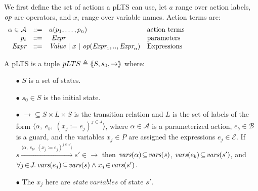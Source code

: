 \documentclass{lncs/llncs}
\newcommand{\QIN}[1]{\textcolor{airforceblue}{#1}}
\def\AlgE{\mathcal{E}}
\def\AlgA{\mathcal{A}}
\def\AlgB{\mathcal{B}}
\begin{document}
We first define the set of actions a pLTS can use, let $a$
range over action labels, $\symb{op}$ are operators, and $x_i$ range over
variable names. Action terms are:
\[
\begin{array}[l]{rcl@{\quad}p{5.5cm}}
  \alpha\in\AlgA&::=&a(p_1,\ldots,p_n)&\text{action terms}\\
  p_i&::=& ~\symb{Expr}&\text{parameters}\\
  \symb{Expr}&::=& \symb{Value}~|~x~|~\symb{op}(\symb{Expr}_1,..,\symb{Expr}_n)&\text{Expressions}
\end{array}
\]


\begin{definition}[pLTS]
\label{pLTS}
A pLTS is a tuple
$pLTS\triangleq\langle\hspace{-0.58ex}\langle S,s_0, \to\rangle\hspace{-0.58ex}\rangle$ where:
\begin{itemize}
\item[$\bullet$]
$S$ is a set of states.
\item[$\bullet$]
$s_0 \in S$ is the initial state.
\item[$\bullet$] $\to \subseteq S \times L \times S$ is the transition relation and 
$L$ is the set of labels of the form
$\langle \alpha,~e_b,~(x_j\!:= {e}_j)^{j\in J}\rangle$,
where $\alpha \in\AlgA$ is a parameterized action, $e_b \in
\AlgB$ is a guard, and the variables $x_j\in P$
are assigned the expressions $e_j\in \AlgE$.
If 
$s \xrightarrow{\langle \alpha,~e_b,~(x_j\!:= {e}_j)^{j\in
		J}\rangle} s'\in \to $ then 
		$\vars(\alpha)\!\subseteq\! \vars(s)$, 
		$\vars(e_b)\!\subseteq\! \vars(s')$, and
		$\forall j\!\in\! J .\,\vars(e_j)\!\subseteq\! \vars(s)\land 
x_j\!\in\!\vars(s')$.
\item[$\bullet$]
The $x_j$ here are $state\ variables$ of state $s'$. 


\end{itemize}
\end{definition}
\end{document}
